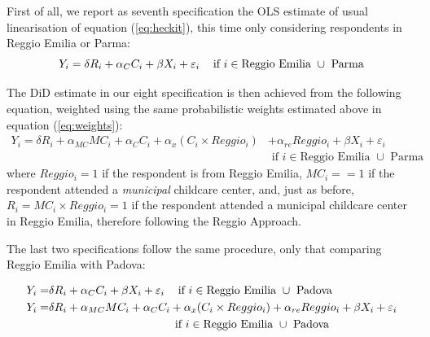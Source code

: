 \documentclass[12pt]{article}
\begin{document}
First of all, we report as seventh specification the OLS estimate of usual linearisation of equation (\ref{eq:heckit}), this time only considering respondents in Reggio Emilia or Parma:
\begin{equation}
Y_{i} = \delta R_{i} + \alpha_{C} C_{i} + \beta X_{i} + \varepsilon_{i}    \hspace{2ex} \text{ if } i \in \text{Reggio Emilia } \cup \text{ Parma} \label{eq7:OLSrepr}
\end{equation}

\medskip

The DiD estimate in our eight specification is then achieved from the following equation, weighted using the same probabilistic weights estimated above in equation (\ref{eq:weights}):
\begin{align}
Y_{i} = \delta R_{i} + \alpha_{MC} MC_{i} + \alpha_{C} C_{i} + \alpha_{x} (C_{i} \times Reggio_{i}) &+  \alpha_{re} Reggio_{i} + \beta X_{i} + \varepsilon_{i} \nonumber \\


   & \text{ if } i \in \text{Reggio Emilia } \cup \text{ Parma} \label{eq8:didpr}

\end{align} 
%
where $Reggio_{i}=1$ if the respondent is from Reggio Emilia, $MC_{i}==1$ if the respondent attended a \textit{municipal} childcare center, and, just as before, $R_{i}=MC_{i} \times Reggio_{i}=1$ if the respondent attended a municipal childcare center in Reggio Emilia, therefore following the Reggio Approach.

\medskip

The last two specifications follow the same procedure, only that comparing Reggio Emilia with Padova:

\begin{align}
Y_{i} =& \delta R_{i} + \alpha_{C} C_{i} + \beta X_{i} + \varepsilon_{i}    \hspace{2ex} \text{ if } i \in \text{Reggio Emilia } \cup \text{ Padova} \label{eq9:OLSrepd} \\


Y_{i} =& \delta R_{i} + \alpha_{MC} MC_{i} + \alpha_{C} C_{i} + \alpha_{x} (C_{i} \times Reggio_{i}) +  \alpha_{re} Reggio_{i} + \beta X_{i} + \varepsilon_{i} \nonumber \\


& \hspace{25ex} \text{ if } i \in \text{Reggio Emilia } \cup \text{ Padova} \label{eq10:didpd}

\end{align}
\end{document}
